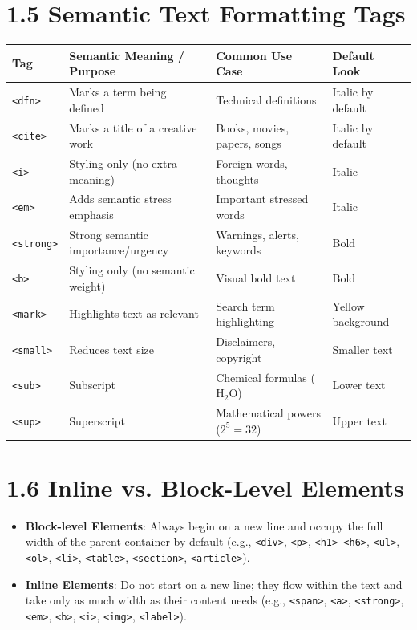 \section{1.5 Semantic Text Formatting Tags}
\begin{center}
\begin{tabularx}{\textwidth}{l X X l}
\toprule
\textbf{Tag} & \textbf{Semantic Meaning / Purpose} & \textbf{Common Use Case} & \textbf{Default Look} \\
\midrule
\texttt{<dfn>} & Marks a term being defined & Technical definitions & Italic by default \\
\texttt{<cite>} & Marks a title of a creative work & Books, movies, papers, songs & Italic by default \\
\texttt{<i>} & Styling only (no extra meaning) & Foreign words, thoughts & Italic \\
\texttt{<em>} & Adds semantic stress emphasis & Important stressed words & Italic \\
\texttt{<strong>} & Strong semantic importance/urgency & Warnings, alerts, keywords & Bold \\
\texttt{<b>} & Styling only (no semantic weight) & Visual bold text & Bold \\
\texttt{<mark>} & Highlights text as relevant & Search term highlighting & Yellow background \\
\texttt{<small>} & Reduces text size & Disclaimers, copyright & Smaller text \\
\texttt{<sub>} & Subscript & Chemical formulas ($\text{H}_2\text{O}$) & Lower text \\
\texttt{<sup>} & Superscript & Mathematical powers ($2^5=32$) & Upper text \\
\bottomrule
\end{tabularx}
\end{center}

\section{1.6 Inline vs. Block-Level Elements}
\begin{itemize}[leftmargin=*]
    \item \textbf{Block-level Elements}: Always begin on a new line and occupy the full width of the parent container by default (e.g., \texttt{<div>}, \texttt{<p>}, \texttt{<h1>-<h6>}, \texttt{<ul>}, \texttt{<ol>}, \texttt{<li>}, \texttt{<table>}, \texttt{<section>}, \texttt{<article>}).
    \item \textbf{Inline Elements}: Do not start on a new line; they flow within the text and take only as much width as their content needs (e.g., \texttt{<span>}, \texttt{<a>}, \texttt{<strong>}, \texttt{<em>}, \texttt{<b>}, \texttt{<i>}, \texttt{<img>}, \texttt{<label>}).
\end{itemize}
